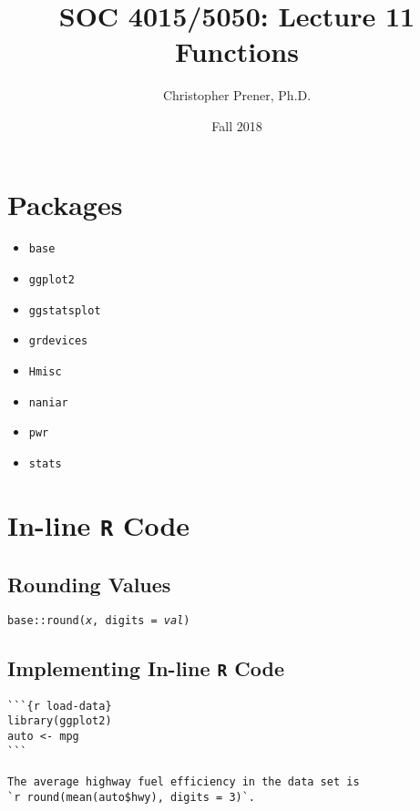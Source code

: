 \documentclass{tufte-handout}
\title{SOC 4015/5050: Lecture 11 Functions}
\author{Christopher Prener, Ph.D.}
\date{Fall 2018}
\newenvironment{subs}
  {\adjustwidth{3em}{0pt}}
  {\endadjustwidth}
\begin{document}
\maketitle %

\vspace{5mm}
\section{Packages}
\begin{itemize}
\item \texttt{base}
\item \texttt{ggplot2}
\item \texttt{ggstatsplot}
\item \texttt{grdevices}
\item \texttt{Hmisc}
\item \texttt{naniar}
\item \texttt{pwr}
\item \texttt{stats}
\end{itemize}

\vspace{5mm}
\section{In-line \texttt{R} Code}
\begin{subs}
\subsection{Rounding Values}
\noindent \texttt{base::}{\color{red}\texttt{round}}\texttt{(\textit{x}, digits = \textit{val})}

\vspace{3mm}
\subsection{Implementing In-line \texttt{R} Code}
\begin{verbatim}
```{r load-data}
library(ggplot2)
auto <- mpg
```

The average highway fuel efficiency in the data set is 
`r round(mean(auto$hwy), digits = 3)`.
\end{verbatim}
\end{subs}

\vspace{5mm}
\end{document}
